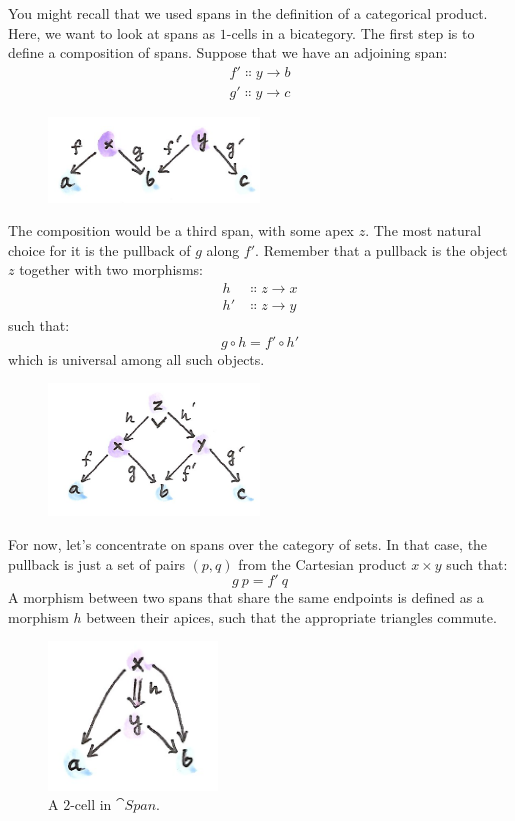 \noindent
You might recall that we used spans in the definition of a categorical
product. Here, we want to look at spans as $1$-cells in a bicategory. The
first step is to define a composition of spans. Suppose that we have an
adjoining span:
\begin{gather*}
f' \Colon y \to b \\
g' \Colon y \to c
\end{gather*}

\begin{figure}[H]
\centering
\includegraphics[width=0.5\textwidth]{images/compspan.png}
\end{figure}

\noindent
The composition would be a third span, with some apex $z$. The
most natural choice for it is the pullback of $g$ along
$f'$. Remember that a pullback is the object $z$
together with two morphisms:
\begin{align*}
h &\Colon z \to x \\
h' &\Colon z \to y
\end{align*}
such that:
\[g \circ h = f' \circ h'\]
which is universal among all such objects.

\begin{figure}[H]
\centering
\includegraphics[width=0.5\textwidth]{images/pullspan.png}
\end{figure}

\noindent
For now, let's concentrate on spans over the category of sets. In that
case, the pullback is just a set of pairs $(p, q)$ from the
Cartesian product $x \times y$ such that:
\[g\ p = f'\ q\]
A morphism between two spans that share the same endpoints is defined as
a morphism $h$ between their apices, such that the appropriate
triangles commute.

\begin{figure}[H]
\centering
\includegraphics[width=0.4\textwidth]{images/morphspan.png}
\caption{A $2$-cell in $\cat{Span}$.}
\end{figure}

